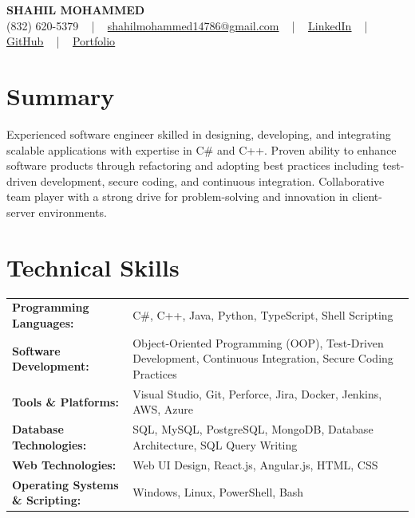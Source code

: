 \documentclass[letterpaper,11pt]{article}
\begin{document}
\begin{center}
    {\fontsize{14pt}{12pt}\selectfont \textbf{\MakeUppercase{Shahil Mohammed}}}\\ \vspace{2pt}
    \fontsize{10pt}{12pt}\selectfont (832) 620-5379 ~ | ~ \href{mailto:shahilmohammed14786@gmail.com}{shahilmohammed14786@gmail.com} ~ | ~  
    \href{https://www.linkedin.com/in/shahil-mohammed-9652931a1/}{\color{blue}\underline{LinkedIn}}  ~ | ~ 
    \href{https://github.com/freakbeast14}{\color{blue}\underline{GitHub}} ~ | ~ 
    \href{https://shahil-mohammed.netlify.app/}{\color{blue}\underline{Portfolio}}
    \vspace{-8pt}
\end{center}

\section{Summary}
\fontsize{9pt}{10pt}\selectfont
Experienced software engineer skilled in designing, developing, and integrating scalable applications with expertise in C\# and C++. Proven ability to enhance software products through refactoring and adopting best practices including test-driven development, secure coding, and continuous integration. Collaborative team player with a strong drive for problem-solving and innovation in client-server environments.
 \vspace{-5pt}
 
\section{Technical Skills}
        \vspace{-14pt}
        \begin{table}[h]
            \fontsize{9pt}{10pt}\selectfont
            \begin{tabular}{p{0.3\linewidth} p{0.7\linewidth}}
                \textbf{Programming Languages:} & C\#, C++, Java, Python, TypeScript, Shell Scripting \\
                \textbf{Software Development:} & Object-Oriented Programming (OOP), Test-Driven Development, Continuous Integration, Secure Coding Practices \\
                \textbf{Tools \& Platforms:} & Visual Studio, Git, Perforce, Jira, Docker, Jenkins, AWS, Azure \\
                \textbf{Database Technologies:} & SQL, MySQL, PostgreSQL, MongoDB, Database Architecture, SQL Query Writing \\
                \textbf{Web Technologies:} & Web UI Design, React.js, Angular.js, HTML, CSS \\
                \textbf{Operating Systems \& Scripting:} & Windows, Linux, PowerShell, Bash \\
            \end{tabular}
        \end{table}
 \vspace{-15pt}
 
\end{document}
